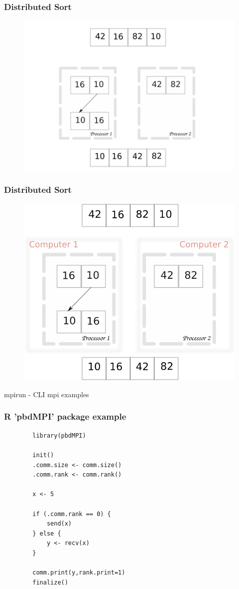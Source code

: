 
\begin{frame}
		\frametitle{Distributed Sort}
		\begin{figure}
				\includegraphics[width=0.8\linewidth]{figures/diagrams/sort/parallelsort}
		\end{figure}
\end{frame}

\begin{frame}
		\frametitle{Distributed Sort}
		\begin{figure}
			\includegraphics[width=0.7\linewidth]{figures/diagrams/sort/distributedsort}
		\end{figure}
\end{frame}

\begin{frame}
		mpirun - CLI mpi examples
\end{frame}

\begin{frame}[fragile]
		\frametitle{R 'pbdMPI' package example}
		\begin{verbatim}
		library(pbdMPI)

		init()
		.comm.size <- comm.size()
		.comm.rank <- comm.rank()

		x <- 5

		if (.comm.rank == 0) {
		    send(x)
		} else {
		    y <- recv(x)
		}

		comm.print(y,rank.print=1)
		finalize()
		\end{verbatim}
\end{frame}

